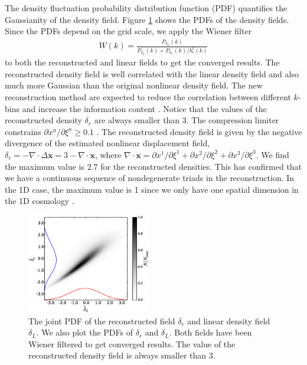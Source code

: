 \documentclass[aps,prl,twocolumn,showpacs,superscriptaddress,groupedaddress,nofootinbib]{revtex4}  %
\newcommand{\bea}{\begin{eqnarray}}
\newcommand{\eea}{\end{eqnarray}}
\begin{document}
The density fluctuation probability distribution function (PDF) quantifies 
the Gaussianity of the density field. 
Figure \ref{fig:pdf} shows the PDFs of the density fields. 
Since the PDFs depend on the grid scale, we apply the Wiener filter
\bea
W(k)=\frac{P_{\delta_L}(k)}{P_{\delta_L}(k)+P_{n_r}(k)/b_r^2(k)}
\eea
to both the reconstructed and linear fields to get the converged results.
The reconstructed density field is well correlated with the linear density 
field and also much more Gaussian than the original nonlinear density field.
The new reconstruction method are expected to reduce the correlation between
different $k$-bins and increase the information content
\cite{1999MNRAS.308.1179M,1999ApJ...527....1S,2005MNRAS.360L..82R}.
Notice that the values of the reconstructed density $\delta_r$ are always
smaller than 3. 
The compression limiter constrains $\partial x^a/\partial\xi^a\geq0.1$ 
\cite{1995ApJS..100..269P,1998ApJS..115...19P}.
The reconstructed density field is given by the negative
divergence of the estimated nonlinear displacement field,
$\delta_r=-\nabla\cdot\Delta{\bm{x}}=3-\nabla\cdot\bm{x}$,
where $\nabla\cdot\bm{x}=\partial x^1/\partial\xi^1+\partial x^2/\partial\xi^2
+\partial x^3/\partial\xi^3$. 
We find the maximum value is $2.7$ for the reconstructed densities.  
This has confirmed that we have a continuous sequence of 
nondegenerate triads in the reconstruction. 
In the 1D case, the maximum value is 1 since we only have one spatial dimension
in the 1D cosmology \cite{2016arXiv160907041Z}.


\begin{figure}[tbp]
\begin{center}
\includegraphics[width=0.48\textwidth]{jointpdf1.eps}
\end{center}
\vspace{-0.7cm}
\caption{The joint PDF of the reconstructed field 
    $\delta_r$ and linear density field $\delta_L$. We also plot the 
PDFs of $\delta_r$ and $\delta_L$. Both fields
have been Wiener filtered to get converged results. The value of the 
reconstructed density field is always smaller than 3.}
\label{fig:pdf}
\end{figure}
\end{document}
